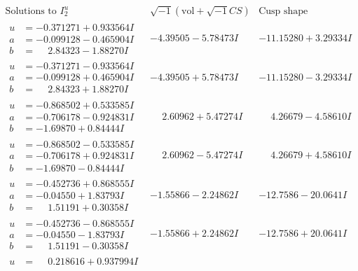 \documentclass[1p]{elsarticle_modified}
\theoremstyle{definition}
\newcommand{\I}{\sqrt{-1}}
\begin{document}
$$\begin{array}{c|c|c}  
\text{Solutions to }I^u_{2}& \I (\text{vol} + \sqrt{-1}CS) & \text{Cusp shape}\\
 \hline 
\begin{aligned}
u &= -0.371271 + 0.933564 I \\
a &= -0.099128 - 0.465904 I \\
b &= \phantom{-}2.84323 - 1.88270 I\end{aligned}
 & -4.39505 - 5.78473 I & -11.15280 + 3.29334 I \\ \hline\begin{aligned}
u &= -0.371271 - 0.933564 I \\
a &= -0.099128 + 0.465904 I \\
b &= \phantom{-}2.84323 + 1.88270 I\end{aligned}
 & -4.39505 + 5.78473 I & -11.15280 - 3.29334 I \\ \hline\begin{aligned}
u &= -0.868502 + 0.533585 I \\
a &= -0.706178 - 0.924831 I \\
b &= -1.69870 + 0.84444 I\end{aligned}
 & \phantom{-}2.60962 + 5.47274 I & \phantom{-}4.26679 - 4.58610 I \\ \hline\begin{aligned}
u &= -0.868502 - 0.533585 I \\
a &= -0.706178 + 0.924831 I \\
b &= -1.69870 - 0.84444 I\end{aligned}
 & \phantom{-}2.60962 - 5.47274 I & \phantom{-}4.26679 + 4.58610 I \\ \hline\begin{aligned}
u &= -0.452736 + 0.868555 I \\
a &= -0.04550 + 1.83793 I \\
b &= \phantom{-}1.51191 + 0.30358 I\end{aligned}
 & -1.55866 - 2.24862 I & -12.7586 - 20.0641 I \\ \hline\begin{aligned}
u &= -0.452736 - 0.868555 I \\
a &= -0.04550 - 1.83793 I \\
b &= \phantom{-}1.51191 - 0.30358 I\end{aligned}
 & -1.55866 + 2.24862 I & -12.7586 + 20.0641 I \\ \hline\begin{aligned}
u &= \phantom{-}0.218616 + 0.937994 I \\

\end{aligned}
\end{array}$$
\end{document}
